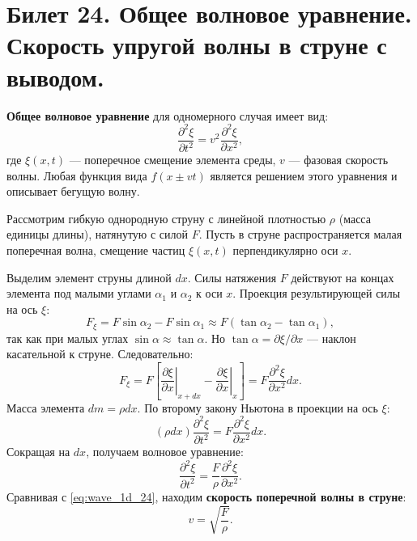 \section{Билет 24. Общее волновое уравнение. Скорость упругой волны в струне с выводом.}

\begin{definition}
\textbf{Общее волновое уравнение} для одномерного случая имеет вид:
\begin{equation}
    \frac{\partial^2 \xi}{\partial t^2} = v^2 \frac{\partial^2 \xi}{\partial x^2}, \label{eq:wave_1d_24}
\end{equation}
где $\xi(x,t)$ --- поперечное смещение элемента среды, $v$ --- фазовая скорость волны. Любая функция вида $f(x \pm vt)$ является решением этого уравнения и описывает бегущую волну.
\end{definition}

\begin{theorem}
Рассмотрим гибкую однородную струну с линейной плотностью $\rho$ (масса единицы длины), натянутую с силой $F$. Пусть в струне распространяется малая поперечная волна, смещение частиц $\xi(x,t)$ перпендикулярно оси $x$.

Выделим элемент струны длиной $dx$. Силы натяжения $F$ действуют на концах элемента под малыми углами $\alpha_1$ и $\alpha_2$ к оси $x$. Проекция результирующей силы на ось $\xi$:
\begin{equation}
    F_{\xi} = F \sin\alpha_2 - F \sin\alpha_1 \approx F(\tan\alpha_2 - \tan\alpha_1),
\end{equation}
так как при малых углах $\sin\alpha \approx \tan\alpha$. Но $\tan\alpha = \partial \xi / \partial x$ --- наклон касательной к струне. Следовательно:
\begin{equation}
    F_{\xi} = F \left[ \left.\frac{\partial \xi}{\partial x}\right|_{x+dx} - \left.\frac{\partial \xi}{\partial x}\right|_{x} \right] = F \frac{\partial^2 \xi}{\partial x^2} dx.
\end{equation}
Масса элемента $dm = \rho dx$. По второму закону Ньютона в проекции на ось $\xi$:
\begin{equation}
    (\rho dx) \frac{\partial^2 \xi}{\partial t^2} = F \frac{\partial^2 \xi}{\partial x^2} dx.
\end{equation}
Сокращая на $dx$, получаем волновое уравнение:
\begin{equation}
    \frac{\partial^2 \xi}{\partial t^2} = \frac{F}{\rho} \frac{\partial^2 \xi}{\partial x^2}.
\end{equation}
Сравнивая с \eqref{eq:wave_1d_24}, находим \textbf{скорость поперечной волны в струне}:
\begin{equation}
    v = \sqrt{\frac{F}{\rho}}. \label{eq:string_speed}
\end{equation}
\end{theorem}

